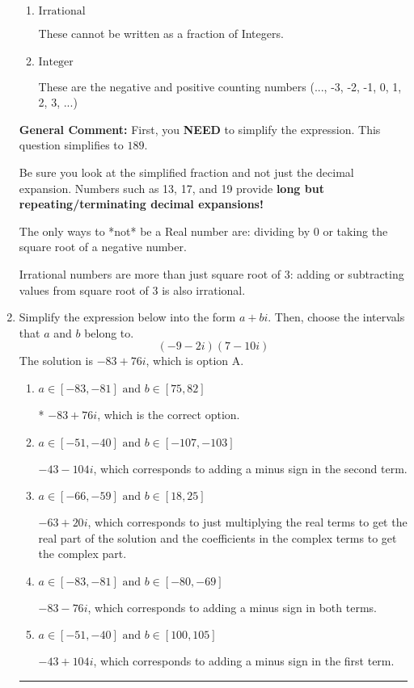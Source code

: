 \documentclass{extbook}[14pt]
\newcommand{\litem}[1]{\item #1

\rule{\textwidth}{0.4pt}}
\begin{document}
\begin{enumerate}
{\begin{enumerate}[label=\Alph*.]
These are Nonreal Complex numbers \textbf{OR} things that are not numbers (e.g., dividing by 0).
\item \( \text{Irrational} \)

These cannot be written as a fraction of Integers.
\item \( \text{Integer} \)

These are the negative and positive counting numbers (..., -3, -2, -1, 0, 1, 2, 3, ...)
\end{enumerate}

\textbf{General Comment:} First, you \textbf{NEED} to simplify the expression. This question simplifies to $189$. 
 
 Be sure you look at the simplified fraction and not just the decimal expansion. Numbers such as 13, 17, and 19 provide \textbf{long but repeating/terminating decimal expansions!} 
 
 The only ways to *not* be a Real number are: dividing by 0 or taking the square root of a negative number. 
 
 Irrational numbers are more than just square root of 3: adding or subtracting values from square root of 3 is also irrational.
}
\litem{
Simplify the expression below into the form $a+bi$. Then, choose the intervals that $a$ and $b$ belong to.
\[ (-9 - 2 i)(7 - 10 i) \]The solution is \( -83 + 76 i \), which is option A.\begin{enumerate}[label=\Alph*.]
\item \( a \in [-83, -81] \text{ and } b \in [75, 82] \)

* $-83 + 76 i$, which is the correct option.
\item \( a \in [-51, -40] \text{ and } b \in [-107, -103] \)

 $-43 - 104 i$, which corresponds to adding a minus sign in the second term.
\item \( a \in [-66, -59] \text{ and } b \in [18, 25] \)

 $-63 + 20 i$, which corresponds to just multiplying the real terms to get the real part of the solution and the coefficients in the complex terms to get the complex part.
\item \( a \in [-83, -81] \text{ and } b \in [-80, -69] \)

 $-83 - 76 i$, which corresponds to adding a minus sign in both terms.
\item \( a \in [-51, -40] \text{ and } b \in [100, 105] \)

 $-43 + 104 i$, which corresponds to adding a minus sign in the first term.
\end{enumerate}

}
\end{enumerate}
\end{document}
